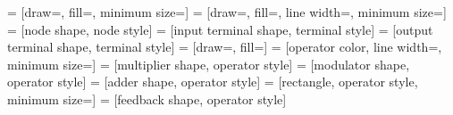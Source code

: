 %


%
%
%
   = [draw=\pathdrawcolor,
      fill=\pathdrawcolor,
      minimum size=\nodesize]
%
   = [draw=\pathdrawcolor,
      fill=\pathfillcolor,
      line width=\pathlinewidth,
      minimum size=\terminalsize]
%
   = [node shape,
      node style]
%
   = [input terminal shape,
      terminal style]
%
   = [output terminal shape,
      terminal style]
%
   = [draw=\operatordrawcolor,
      fill=\operatorfillcolor]
%
   = [operator color,
      line width=\operatorlinewidth,
      minimum size=\operatorsize]
%
   = [multiplier shape,
      operator style]
%
   = [modulator shape,
      operator style]
%
   = [adder shape,
      operator style]
%
   = [rectangle,
      operator style,
      minimum size=\delaysize]
%
  = [feedback shape,
     operator style]

\newcommand{\stdaboveanchor}{%
  \anchor{text}{%
    \centerpoint
    \advance\pgf@x by-0.5\wd\pgfnodeparttextbox%
    \advance\pgf@y by\radius
    \advance\pgf@y by+0.5mm
  }
}%
\newcommand{\stdrightanchor}{%
  \anchor{text}{%
    \centerpoint
    \advance\pgf@x by\radius
    \advance\pgf@x by+0.5mm
    \advance\pgf@y by-0.5\ht\pgfnodeparttextbox%
    \advance\pgf@y by+0.5\dp\pgfnodeparttextbox%
  }
}%
\newcommand{\stdbelowanchor}{%
  \anchor{text}{%
    \centerpoint
    \advance\pgf@x by-0.5\wd\pgfnodeparttextbox%
    \advance\pgf@y by-\ht\pgfnodeparttextbox%
    \advance\pgf@y by-\radius
    \advance\pgf@y by-0.5mm
  }
}%
\newcommand{\stdleftanchor}{%
  \anchor{text}{%
    \centerpoint
    \advance\pgf@x by-\radius
    \advance\pgf@x by-\wd\pgfnodeparttextbox%
    \advance\pgf@x by-0.5mm
    \advance\pgf@y by-0.5\ht\pgfnodeparttextbox%
    \advance\pgf@y by+0.5\dp\pgfnodeparttextbox%
  }
}%

